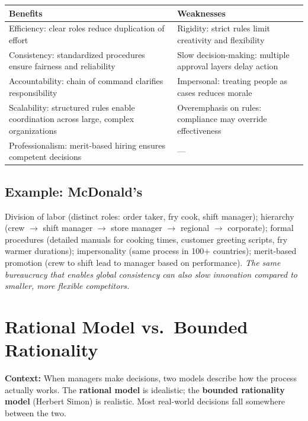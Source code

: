 \documentclass[11pt, letterpaper]{article}
\begin{document}
\begin{center}
\begin{tabular}{p{6.5cm} p{6.5cm}}
\toprule
\textbf{Benefits} & \textbf{Weaknesses} \\
\midrule
Efficiency: clear roles reduce duplication of effort & Rigidity: strict rules limit creativity and flexibility \\
Consistency: standardized procedures ensure fairness and reliability & Slow decision-making: multiple approval layers delay action \\
Accountability: chain of command clarifies responsibility & Impersonal: treating people as cases reduces morale \\
Scalability: structured rules enable coordination across large, complex organizations & Overemphasis on rules: compliance may override effectiveness \\
Professionalism: merit-based hiring ensures competent decisions & --- \\
\bottomrule
\end{tabular}
\end{center}

\subsection{Example: McDonald's}

Division of labor (distinct roles: order taker, fry cook, shift manager); hierarchy (crew $\rightarrow$ shift manager $\rightarrow$ store manager $\rightarrow$ regional $\rightarrow$ corporate); formal procedures (detailed manuals for cooking times, customer greeting scripts, fry warmer durations); impersonality (same process in 100+ countries); merit-based promotion (crew to shift lead to manager based on performance). \textit{The same bureaucracy that enables global consistency can also slow innovation compared to smaller, more flexible competitors.}

\newpage

\section{Rational Model vs.\ Bounded Rationality}

\begin{defbox}
\textbf{Context:} When managers make decisions, two models describe how the process actually works. The \textbf{rational model} is idealistic; the \textbf{bounded rationality model} (Herbert Simon) is realistic. Most real-world decisions fall somewhere between the two.
\end{defbox}
\end{document}
